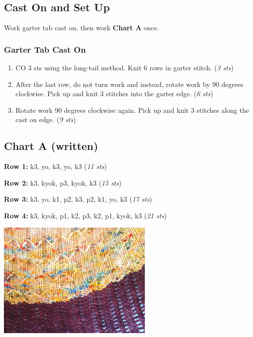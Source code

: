 \documentclass[12pt]{article}
\newcommand{\rowDir}[1]{\textbf{#1:}} %
\newcommand{\stitchcount}[1]{(\emph{#1 sts})}
\newenvironment{unframed}
    {%
	\setlength{\parindent}{-2em}
	\begin{addmargin}[2em]{0pt}}
    {\end{addmargin}
	\setlength{\parindent}{0em}}
\begin{document}
\newpage

\begin{multicols}{2}
\section*{Cast On and Set Up}
Work garter tab cast on, then work \textbf{Chart A} once.
\vspace{-1em}
\subsubsection*{Garter Tab Cast On}

\begin{enumerate}
\item CO 3 sts using the long-tail method. Knit 6 rows in garter stitch. \stitchcount{3}
\item After the last row, do not turn work and instead, rotate work by 90 degrees clockwise. Pick up and knit 3 stitches into the garter edge. \stitchcount{6}
\item Rotate work 90 degrees clockwise again. Pick up and knit 3 stitches along the cast on edge. \stitchcount{9}
\end{enumerate}

\subsection*{Chart A (written)}

\begin{unframed}
\hspace{-2em}\rowDir{Row 1} k3, yo, k3, yo, k3 \stitchcount{11}

\rowDir{Row 2} k3, kyok, p3, kyok, k3 \stitchcount{15}

\rowDir{Row 3} k3, yo, k1, p2, k3, p2, k1, yo, k3 \stitchcount{17}

\rowDir{Row 4} k3, kyok, p1, k2, p3, k2, p1, kyok, k3 \stitchcount{21}
\end{unframed}

\vfill
\begin{center}
\includegraphics[width=3in]{detail1.jpg}
\end{center}
\vfill
\columnbreak


\end{multicols}
\end{document}

